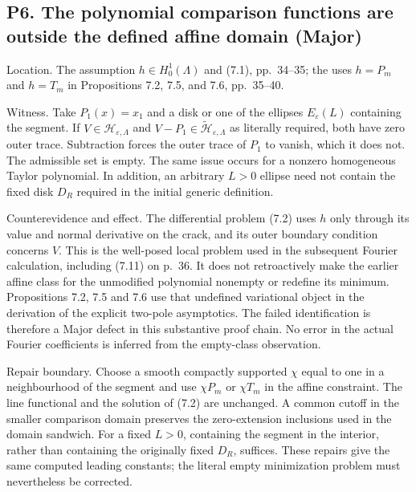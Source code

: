 \documentclass[10pt]{article}
\begin{document}
\subsection*{P6. The polynomial comparison functions are outside the defined affine domain (Major)}
Location. The assumption \(h\in H_0^1(\Lambda)\) and (7.1), pp. 34–35; the uses \(h=P_m\) and \(h=T_m\) in Propositions 7.2, 7.5, and 7.6, pp. 35–40.\par
Witness. Take \(P_1(x)=x_1\) and a disk or one of the ellipses \(E_\varepsilon(L)\) containing the segment. If \(V\in\mathcal H_{\varepsilon,\Lambda}\) and \(V-P_1\in\widetilde{\mathcal H}_{\varepsilon,\Lambda}\) as literally required, both have zero outer trace. Subtraction forces the outer trace of \(P_1\) to vanish, which it does not. The admissible set is empty. The same issue occurs for a nonzero homogeneous Taylor polynomial. In addition, an arbitrary \(L>0\) ellipse need not contain the fixed disk \(D_R\) required in the initial generic definition.\par
Counterevidence and effect. The differential problem (7.2) uses \(h\) only through its value and normal derivative on the crack, and its outer boundary condition concerns \(V\). This is the well-posed local problem used in the subsequent Fourier calculation, including (7.11) on p. 36. It does not retroactively make the earlier affine class for the unmodified polynomial nonempty or redefine its minimum. Propositions 7.2, 7.5 and 7.6 use that undefined variational object in the derivation of the explicit two-pole asymptotics. The failed identification is therefore a Major defect in this substantive proof chain. No error in the actual Fourier coefficients is inferred from the empty-class observation.\par
Repair boundary. Choose a smooth compactly supported \(\chi\) equal to one in a neighbourhood of the segment and use \(\chi P_m\) or \(\chi T_m\) in the affine constraint. The line functional and the solution of (7.2) are unchanged. A common cutoff in the smaller comparison domain preserves the zero-extension inclusions used in the domain sandwich. For a fixed \(L>0\), containing the segment in the interior, rather than containing the originally fixed \(D_R\), suffices. These repairs give the same computed leading constants; the literal empty minimization problem must nevertheless be corrected.\par
\end{document}
